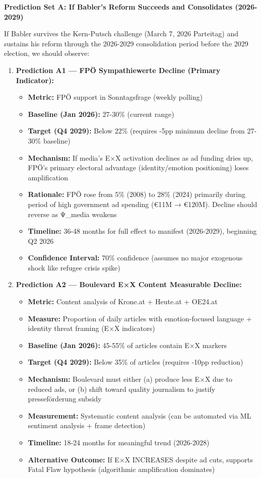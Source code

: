 \textbf{Prediction Set A: If Babler's Reform Succeeds and Consolidates (2026-2029)}

If Babler survives the Kern-Putsch challenge (March 7, 2026 Parteitag) and sustains his reform
through the 2026-2029 consolidation period before the 2029 election, we should observe:

\begin{enumerate}

\item \textbf{Prediction A1 — FPÖ Sympathiewerte Decline (Primary Indicator):}
  \begin{itemize}
  \item \textbf{Metric:} FPÖ support in Sonntagsfrage (weekly polling)
  \item \textbf{Baseline (Jan 2026):} 27-30\% (current range)
  \item \textbf{Target (Q4 2029):} Below 22\% (requires -5pp minimum decline from 27-30\% baseline)
  \item \textbf{Mechanism:} If media's E×X activation declines as ad funding dries up, FPÖ's
    primary electoral advantage (identity/emotion positioning) loses amplification
  \item \textbf{Rationale:} FPÖ rose from 5\% (2008) to 28\% (2024) primarily during period
    of high government ad spending (€11M → €120M). Decline should reverse as Ψ_media weakens
  \item \textbf{Timeline:} 36-48 months for full effect to manifest (2026-2029), beginning Q2 2026
  \item \textbf{Confidence Interval:} 70\% confidence (assumes no major exogenous shock like
    refugee crisis spike)
  \end{itemize}

\item \textbf{Prediction A2 — Boulevard E×X Content Measurable Decline:}
  \begin{itemize}
  \item \textbf{Metric:} Content analysis of Krone.at + Heute.at + OE24.at
  \item \textbf{Measure:} Proportion of daily articles with emotion-focused language +
    identity threat framing (E×X indicators)
  \item \textbf{Baseline (Jan 2026):} 45-55\% of articles contain E×X markers
  \item \textbf{Target (Q4 2029):} Below 35\% of articles (requires -10pp reduction)
  \item \textbf{Mechanism:} Boulevard must either (a) produce less E×X due to reduced ads,
    or (b) shift toward quality journalism to justify presseförderung subsidy
  \item \textbf{Measurement:} Systematic content analysis (can be automated via ML sentiment
    analysis + frame detection)
  \item \textbf{Timeline:} 18-24 months for meaningful trend (2026-2028)
  \item \textbf{Alternative Outcome:} If E×X INCREASES despite ad cuts, supports Fatal Flaw
    hypothesis (algorithmic amplification dominates)
  \end{itemize}


\end{enumerate}
